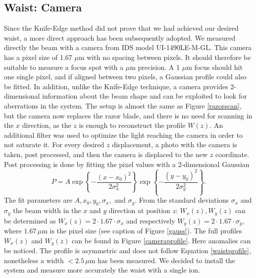 \subsection{Waist: Camera}
\label{waistcamera}
Since the Knife-Edge method did not prove that we had achieved our desired waist, a  more direct approach has been subsequently adopted. We measured directly the beam with a camera from IDS model UI-1490LE-M-GL. This camera has a pixel size of 1.67 $\mu$m with no spacing between pixels. It should therefore be suitable to measure a focus spot with a $\mu$m precision. A 1 $\mu$m focus should hit one single pixel, and if aligned between two pixels, a Gaussian profile could also be fitted.
In addition, unlike the Knife-Edge technique, a camera provides 2-dimensional information about the beam shape and can be exploited to look for aberrations in the system. The setup is almost the same as Figure \ref{razorscan}, but the camera now replaces the razor blade, and there is no need for scanning in the $x$ direction, as the $z$ is enough to reconstruct the profile $W(z)$. An additional filter was used to optimize the light reaching the camera in order to not saturate it.
%
For every desired $z$ displacement, a photo with the camera is taken, post processed, and then the camera is displaced to the new $z$ coordinate. Post processing is done by fitting the pixel values with a 2-dimensional Gaussian
\begin{equation}
P = A \exp\left\{-\frac{(x-x_0)^2}{2\sigma_x^2}\right\} \exp\left\{-\frac{(y-y_0)^2}{2\sigma_y^2} \right\}.
\end{equation}
The fit parameters are $A,x_0,y_0,\sigma_x,$ and $\sigma_y$. From the standard deviations $\sigma_x$ and $\sigma_y$ the beam width in the $x$ and $y$ direction at position $z$: $W_x(z),W_y(z)$ can be determined as $W_x(z) = 2\cdot 1.67\cdot \sigma_x$ and respectively $W_y(z) = 2\cdot 1.67\cdot \sigma_y$, where $1.67\,\mu$m is the pixel size (see caption of Figure \ref{gauss}). The full profiles $W_x(z)$ and $W_{y}(z)$ can be found in Figure \ref{cameraprofile}. Here anomalies can be noticed. The profile is asymmetric and does not follow Equation \ref{waistprofile}, nonetheless a width $<2.5\,\mu$m has been measured. We decided to install the system and measure more accurately the waist with a single ion.
